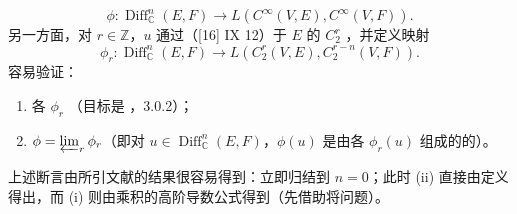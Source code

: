 \[\phi:\operatorname{Diff}_{\mathbb C}^n(E,F)\longrightarrow L(C^\infty(V,E),C^\infty(V,F)).\]
另一方面，对 $r\in\mathbb Z$，$u$ 通过（[16] IX  12）于 $E$ 的 $C_2^r$ ，并定义映射
\[\phi_r:\operatorname{Diff}_{\mathbb C}^n(E,F)\longrightarrow L(C_2^r(V,E),C_2^{r-n}(V,F)).\]
容易验证：
\begin{enumerate}
\item[(i)] 各 $\phi_r$ （目标是 ，3.0.2）；
\item[(ii)] $\phi=\varprojlim_r\phi_r$（即对 $u\in\operatorname{Diff}_{\mathbb C}^n(E,F)$，$\phi(u)$ 是由各 $\phi_r(u)$ 组成的的）。
\end{enumerate}
上述断言由所引文献的结果很容易得到：立即归结到 $n=0$；此时 (ii) 直接由定义得出，而 (i) 则由乘积的高阶导数公式得到（先借助将问题）。

